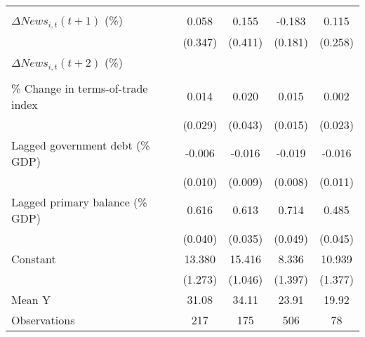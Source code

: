 {\begin{tabular}{l*{4}{c}}
                    &                     &                     &                     &                     \\
\addlinespace
$ \Delta News_{i,t}(t+1)$ (\%)&       0.058         &       0.155         &      -0.183         &       0.115         \\
                    &     (0.347)         &     (0.411)         &     (0.181)         &     (0.258)         \\
\addlinespace
$ \Delta News_{i,t}(t+2)$ (\%)&                     &                     &                     &                     \\
                    &                     &                     &                     &                     \\
\addlinespace
\% Change in terms-of-trade index&       0.014         &       0.020         &       0.015         &       0.002         \\
                    &     (0.029)         &     (0.043)         &     (0.015)         &     (0.023)         \\
\addlinespace
Lagged government debt (\% GDP)&      -0.006         &      -0.016\sym{*}  &      -0.019\sym{**} &      -0.016         \\
                    &     (0.010)         &     (0.009)         &     (0.008)         &     (0.011)         \\
\addlinespace
Lagged primary balance (\% GDP)&       0.616\sym{***}&       0.613\sym{***}&       0.714\sym{***}&       0.485\sym{***}\\
                    &     (0.040)         &     (0.035)         &     (0.049)         &     (0.045)         \\
\addlinespace
Constant            &      13.380\sym{***}&      15.416\sym{***}&       8.336\sym{***}&      10.939\sym{***}\\
                    &     (1.273)         &     (1.046)         &     (1.397)         &     (1.377)         \\
\midrule
Mean Y              &       31.08         &       34.11         &       23.91         &       19.92         \\
Observations        &         217         &         175         &         506         &          78         \\
\bottomrule
\end{tabular}
}
